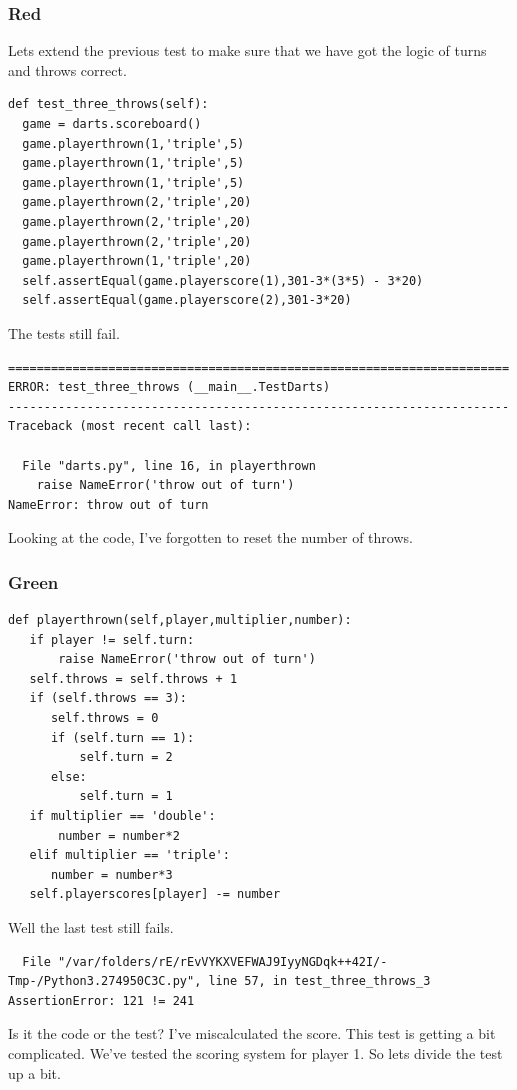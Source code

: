 \documentclass{beamer}
\begin{document}
\begin{frame}[fragile]
\frametitle{Red}
Lets extend the previous test to make sure that we have got the logic
of turns and throws correct.
\begin{lstlisting}
def test_three_throws(self):
  game = darts.scoreboard()
  game.playerthrown(1,'triple',5)
  game.playerthrown(1,'triple',5)
  game.playerthrown(1,'triple',5)
  game.playerthrown(2,'triple',20)
  game.playerthrown(2,'triple',20)
  game.playerthrown(2,'triple',20)
  game.playerthrown(1,'triple',20)
  self.assertEqual(game.playerscore(1),301-3*(3*5) - 3*20)
  self.assertEqual(game.playerscore(2),301-3*20)
\end{lstlisting}

  
\end{frame}
\begin{frame}[fragile]
The tests still fail.

\begin{verbatim}
======================================================================
ERROR: test_three_throws (__main__.TestDarts)
----------------------------------------------------------------------
Traceback (most recent call last):

  File "darts.py", line 16, in playerthrown
    raise NameError('throw out of turn')
NameError: throw out of turn
\end{verbatim}

Looking at the
code, I've forgotten to reset the number of throws.
  
\end{frame}
\begin{frame}[fragile]
\frametitle{Green}
\begin{lstlisting}
def playerthrown(self,player,multiplier,number):
   if player != self.turn:
       raise NameError('throw out of turn')
   self.throws = self.throws + 1
   if (self.throws == 3):
      self.throws = 0
      if (self.turn == 1):
          self.turn = 2
      else:
          self.turn = 1
   if multiplier == 'double':
       number = number*2
   elif multiplier == 'triple':
      number = number*3
   self.playerscores[player] -= number
\end{lstlisting}
\end{frame}
\begin{frame}[fragile]
Well the last test still fails.
\begin{verbatim}
  File "/var/folders/rE/rEvVYKXVEFWAJ9IyyNGDqk++42I/-Tmp-/Python3.274950C3C.py", line 57, in test_three_throws_3
AssertionError: 121 != 241
\end{verbatim}
Is it the code or the test? I've miscalculated the score.
This test is getting a bit complicated. We've tested the scoring
system for  player 1. So lets divide the test up a bit.
\end{frame}
\end{document}
